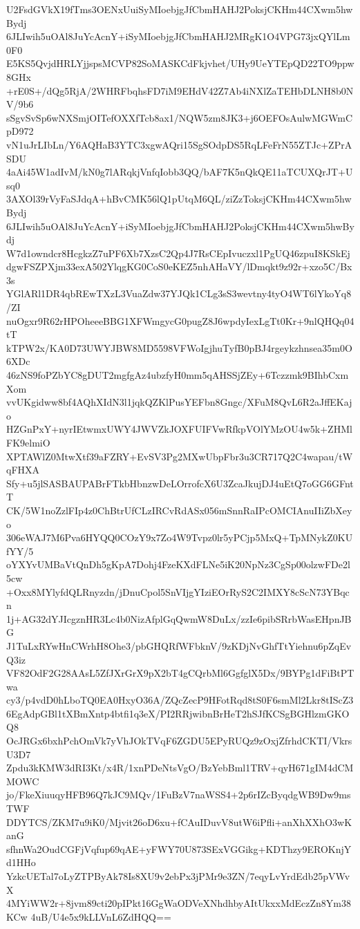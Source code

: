 U2FsdGVkX19fTms3OENxUuiSyMIoebjgJfCbmHAHJ2PoksjCKHm44CXwm5hwBydj
6JLIwih5uOAl8JuYcAcnY+iSyMIoebjgJfCbmHAHJ2MRgK1O4VPG73jxQYlLm0F0
E5KS5QvjdHRLYjjspsMCVP82SoMASKCdFkjvhet/UHy9UeYTEpQD22TO9ppw8GHx
+rE0S+/dQg5RjA/2WHRFbqhsFD7iM9EHdV42Z7Ab4iNXlZaTEHbDLNH8b0NV/9b6
sSgvSvSp6wNXSmjOITefOXXfTcb8ax1/NQW5zm8JK3+j6OEFOsAulwMGWmCpD972
vN1uJrLIbLn/Y6AQHaB3YTC3xgwAQri15SgSOdpDS5RqLFeFrN55ZTJc+ZPrASDU
4aAi45W1adIvM/kN0g7lARqkjVnfqIobb3QQ/bAF7K5nQkQE11aTCUXQrJT+Usq0
3AXOl39rVyFaSJdqA+hBvCMK56lQ1pUtqM6QL/ziZzToksjCKHm44CXwm5hwBydj
6JLIwih5uOAl8JuYcAcnY+iSyMIoebjgJfCbmHAHJ2PoksjCKHm44CXwm5hwBydj
W7d1owndcr8HcgkzZ7uPF6Xb7XzsC2Qp4J7RsCEpIvuczxl1PgUQ46zpuI8KSkEj
dgwFSZPXjm33exA502YlqgKG0CoS0eKEZ5nhAHaVY/lDmqkt9z92r+xzo5C/Bx3s
YGlARl1DR4qbREwTXzL3VuaZdw37YJQk1CLg3sS3wevtny4tyO4WT6lYkoYq8/ZI
nuOgxr9R62rHPOheeeBBG1XFWmgycG0pugZ8J6wpdyIexLgTt0Kr+9nlQHQq04tT
kTPW2x/KA0D73UWYJBW8MD5598VFWoIgjhuTyfB0pBJ4rgeykzhnsea35m0O6XDc
46zNS9foPZbYC8gDUT2mgfgAz4ubzfyH0mm5qAHSSjZEy+6Tczzmk9BIhbCxmXom
vvUKgidww8bf4AQhXIdN3l1jqkQZKlPusYEFbn8Gngc/XFuM8QvL6R2aJffEKajo
HZGnPxY+nyrIEtwmxUWY4JWVZkJOXFUIFVwRfkpVOlYMzOU4w5k+ZHMlFK9elmiO
XPTAWlZ0MtwXtf39aFZRY+EvSV3Pg2MXwUbpFbr3u3CR717Q2C4wapau/tWqFHXA
Sfy+u5jlSASBAUPABrFTkbHbnzwDeLOrrofcX6U3ZcaJkujDJ4uEtQ7oGG6GFntT
CK/5W1noZzlFIp4z0ChBtrUfCLzIRCvRdASx056mSnnRaIPcOMCIAnuIIiZbXeyo
306eWAJ7M6Pva6HYQQ0COzY9x7Zo4W9Tvpz0lr5yPCjp5MxQ+TpMNykZ0KUfYY/5
oYXYvUMBaVtQnDh5gKpA7Dohj4FzeKXdFLNe5iK20NpNz3CgSp00olzwFDe2l5cw
+Oxx8MYlyfdQLRnyzdn/jDnuCpol5SnVIjgYIziEOrRyS2C2IMXY8cScN73YBqcn
1j+AG32dYJIcgznHR3Lc4b0NizAfplGqQwmW8DuLx/zzIe6pibSRrbWasEHpnJBG
J1TuLxRYwHnCWrhH8Ohe3/pbGHQRfWFbknV/9zKDjNvGhfTtYiehnu6pZqEvQ3iz
VF82OdF2G28AAsL5ZfJXrGrX9pX2bT4gCQrbMl6GgfglX5Dx/9BYPg1dFiBtPTwa
cy3/p4vdD0hLboTQ0EA0HxyO36A/ZQcZecP9HFotRqd8tS0F6smMl2Lkr8tIScZ3
6EgAdpGBl1tXBmXntp4btfi1q3eX/PI2RRjwibnBrHeT2hSJfKCSgBGHlzmGKOQ8
OcJRGx6bxhPchOmVk7yVhJOkTVqF6ZGDU5EPyRUQz9zOxjZfrhdCKTI/VkrsU3D7
Zpdu3kKMW3dRI3Kt/x4R/1xnPDeNtsVgO/BzYebBml1TRV+qyH671gIM4dCMMOWC
jo/FkeXiuuqyHFB96Q7kJC9MQv/1FuBzV7naWSS4+2p6rIZcByqdgWB9Dw9msTWF
DDYTCS/ZKM7u9iK0/Mjvit26oD6xu+fCAuIDuvV8utW6iPfli+anXhXXhO3wKanG
sfhnWa2OudCGFjVqfup69qAE+yFWY70U873SExVGGikg+KDThzy9EROKnjYd1HHo
YzkcUETal7oLyZTPByAk78Is8XU9v2ebPx3jPMr9e3ZN/7eqyLvYrdEdb25pVWvX
4MYiWW2r+8jvm89cti20pIPkt16GgWaODVeXNhdhbyAItUkxxMdEczZn8Ym38KCw
4uB/U4e5x9kLLVnL6ZdHQQ==
